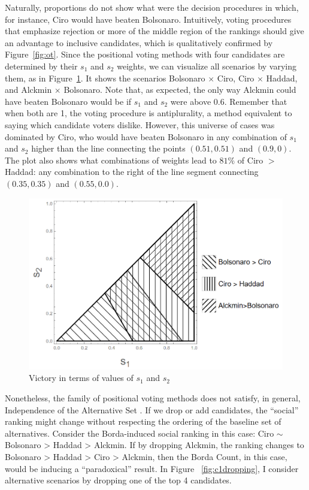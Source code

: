 \documentclass[hidelinks,11pt]{article} \usepackage[utf8]{inputenc}
\begin{document}
Naturally, proportions do not show what were the decision procedures in which,
for instance, Ciro would have beaten Bolsonaro. Intuitively, voting procedures
that emphasize rejection or more of the middle region of the rankings should
give an advantage to inclusive candidates, which is qualitatively confirmed by
Figure~\ref{fig:ot}. Since the positional voting methods with four candidates
are determined by their \(s_{1}\) and \(s_{2}\) weights, we can visualize all
scenarios by varying them, as in Figure~\ref{fig:positional4c}. It shows the
scenarios Bolsonaro \(\times\) Ciro, Ciro \(\times \) Haddad, and Alckmin
\(\times\) Bolsonaro. Note that, as expected, the only way Alckmin could have
beaten Bolsonaro would be if \(s_{1}\) and \(s_{2}\) were above 0.6. Remember
that when both are 1, the voting procedure is antiplurality, a method equivalent
to saying which candidate voters dislike. However, this universe of cases was
dominated by Ciro, who would have beaten Bolsonaro in any combination of
\(s_{1}\) and \(s_{2}\) higher than the line connecting the points
\((0.51,0.51)\) and \((0.9,0)\). The plot also shows what combinations of
weights lead to \(81\%\) of Ciro \(>\) Haddad: any combination to the right of
the line segment connecting \((0.35,0.35)\) and \((0.55,0.0)\).

\begin{figure}[!h] \centering \includegraphics[width=\columnwidth,
height=0.3\textheight]{./images/counterfactual_triangle.png}
\caption{Victory in terms of values of \(s_{1}\) and \(s_{2}\)}
 \label{fig:positional4c}
\end{figure}


Nonetheless, the family of positional voting methods does not satisfy, in general,  Independence
of the Alternative Set \parencite{kaminski2015empirical}. If we drop or add
candidates, the ``social'' ranking might change without respecting the ordering
of the baseline set of alternatives. Consider the Borda-induced social ranking
in this case: Ciro \( \sim \) Bolsonaro > Haddad > Alckmin. If by dropping
Alckmin, the ranking changes to Bolsonaro > Haddad > Ciro > Alckmin, then the
Borda Count, in this case, would be inducing a ``paradoxical'' result. In Figure
~\ref{fig:c1dropping}, I consider alternative scenarios by dropping one of the
top 4 candidates.
\end{document}
